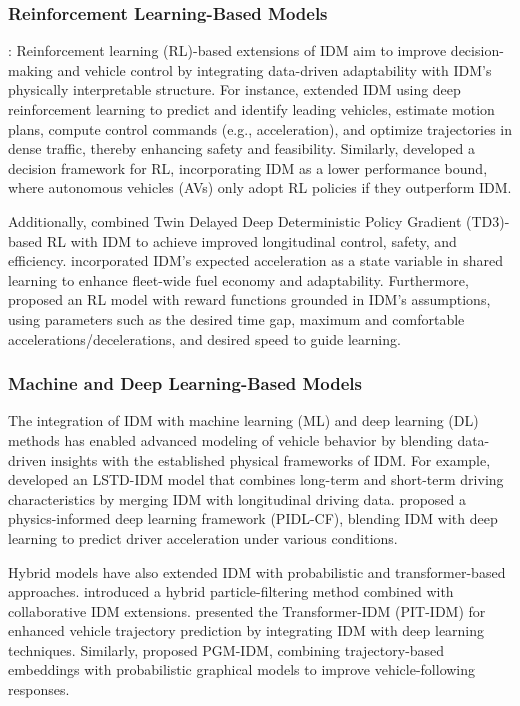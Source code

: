 \documentclass[a4paper,fleqn]{cas-sc}
\begin{document}
\subsubsection{Reinforcement Learning-Based Models}: Reinforcement learning (RL)-based extensions of IDM aim to improve decision-making and vehicle control by integrating data-driven adaptability with IDM’s physically interpretable structure. For instance, \cite{brito_learning_2022} extended IDM using deep reinforcement learning to predict and identify leading vehicles, estimate motion plans, compute control commands (e.g., acceleration), and optimize trajectories in dense traffic, thereby enhancing safety and feasibility. Similarly, \cite{caoTrustworthySafetyImprovementAutonomous2022a} developed a decision framework for RL, incorporating IDM as a lower performance bound, where autonomous vehicles (AVs) only adopt RL policies if they outperform IDM. 

Additionally, \cite{baiLongitudinalControlAutomatedVehicles2024a} combined Twin Delayed Deep Deterministic Policy Gradient (TD3)-based RL with IDM to achieve improved longitudinal control, safety, and efficiency. \cite{kerbel_shared_2024} incorporated IDM’s expected acceleration as a state variable in shared learning to enhance fleet-wide fuel economy and adaptability. Furthermore, \cite{hartRobustCarfollowingBasedDeep2024} proposed an RL model with reward functions grounded in IDM’s assumptions, using parameters such as the desired time gap, maximum and comfortable accelerations/decelerations, and desired speed to guide learning.

\subsubsection{Machine and Deep Learning-Based Models}

The integration of IDM with machine learning (ML) and deep learning (DL) methods has enabled advanced modeling of vehicle behavior by blending data-driven insights with the established physical frameworks of IDM. For example, \cite{chen_investigating_2020} developed an LSTD-IDM model that combines long-term and short-term driving characteristics by merging IDM with longitudinal driving data. \cite{moPhysicsInformedDeepLearningParadigm2021c} proposed a physics-informed deep learning framework (PIDL-CF), blending IDM with deep learning to predict driver acceleration under various conditions.

Hybrid models have also extended IDM with probabilistic and transformer-based approaches. \cite{bhattacharyya_hybrid_2022} introduced a hybrid particle-filtering method combined with collaborative IDM extensions. \cite{gengPhysicsInformedTransformerModelVehicle2023b} presented the Transformer-IDM (PIT-IDM) for enhanced vehicle trajectory prediction by integrating IDM with deep learning techniques. Similarly, \cite{kangTrajectoryBasedEmbeddingRandomCoefficients2023b} proposed PGM-IDM, combining trajectory-based embeddings with probabilistic graphical models to improve vehicle-following responses. 
\end{document}
